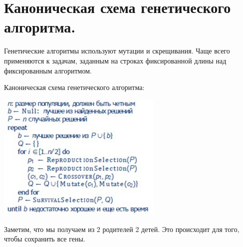\section{Каноническая схема генетического алгоритма.}

Генетические алгоритмы используют мутации и скрещивания. Чаще всего применяются к задачам, заданным на строках фиксированной длины над фиксированным алгоритмом. 

Каноническая схема генетического алгоритма:

\includegraphics[width=300]{images/13bilet.jpg}   

Заметим, что мы получаем из 2 родителей 2 детей. Это происходит для того, чтобы сохранить все гены.